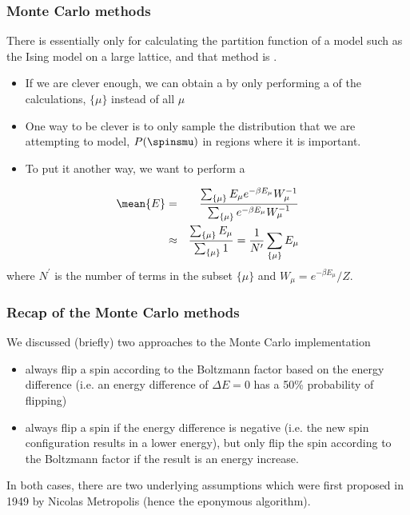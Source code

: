 \documentclass[hyperref={colorlinks=true}]{beamer}
\begin{document}
\begin{frame}%
  \frametitle{Monte Carlo methods}
  
  There is essentially only  for calculating the partition function of a model such as the Ising model on a large lattice, and that method is . 
  
  \begin{itemize}
    \item If we are clever enough, we can obtain a  by only performing a  of the calculations, $\{\mu\}$ instead of all $\mu$
    \item One way to be clever is to only sample the distribution that we are attempting to model, $P(\spinsmu)$ in regions where it is important.
    \item To put it another way, we want to perform a 
  \end{itemize}
  \begin{eqnarray}
    \mean{E} &=& \frac{\sum_{\{\mu\}} E_{\mu} e^{-\beta E_{\mu}} W_{\mu}^{-1}}{\sum_{\{\mu\}} e^{-\beta E_{\mu}} W_{\mu}^{-1}} \\
       &\approx& \frac{\sum_{\{\mu\}} E_{\mu}}{\sum_{\{\mu\}} 1} = \frac{1}{N^{\prime}}\sum_{\{\mu\}} E_{\mu}
  \end{eqnarray} 
  where $N^{\prime}$ is the number of terms in the subset $\{\mu\}$ and $W_{\mu} = e^{- \beta E_{\mu}}/Z$.
  
\end{frame}


\begin{frame}%
  \frametitle{Recap of the Monte Carlo methods}

   We discussed (briefly) two approaches to the Monte Carlo implementation
   
   \begin{itemize}
     \item {} always flip a spin according to the Boltzmann factor based on the energy difference (i.e. an energy difference of $\Delta E = 0$ has a 50\% probability of flipping)
     \item {} always flip a spin if the energy difference is negative (i.e. the new spin configuration results in a lower energy), but only flip the spin according to the Boltzmann factor if the result is an energy increase.
   \end{itemize}
 
   In both cases, there are two underlying assumptions which were first proposed in 1949 by Nicolas Metropolis (hence the eponymous algorithm).
 
\end{frame}
\end{document}
